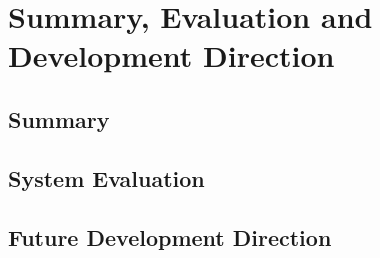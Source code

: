 \chapter{Summary, Evaluation and Development Direction}
\section{Summary}
\section{System Evaluation}
\section{Future Development Direction}